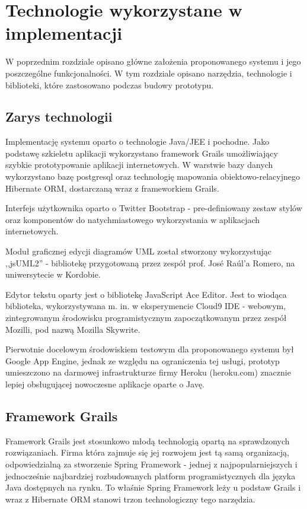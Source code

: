 \chapter{Technologie wykorzystane w implementacji}
  
  W poprzednim rozdziale opisano główne założenia proponowanego systemu i jego poszczególne funkcjonalności. W tym rozdziale opisano narzędzia, technologie i biblioteki, które zastosowano podczas budowy prototypu.

  \section{Zarys technologii}
    
    Implementację systemu oparto o technologie Java/JEE i pochodne. Jako podstawę szkieletu aplikacji wykorzystano framework Grails umożliwiający szybkie prototypowanie aplikacji internetowych. W warstwie bazy danych wykorzystano bazę postgresql oraz technologię mapowania obiektowo-relacyjnego Hibernate ORM, dostarczaną wraz z frameworkiem Grails. 
    
    Interfejs użytkownika oparto o Twitter Bootstrap - pre-definiowany zestaw stylów oraz komponentów do natychmiastowego wykorzystania w aplikacjach internetowych. 

    Moduł graficznej edycji diagramów UML został stworzony wykorzystując ,,jsUML2'' - bibliotekę przygotowaną przez zespół prof. José Raúl'a Romero, na uniwersytecie w Kordobie. 

    Edytor tekstu oparty jest o bibliotekę JavaScript Ace Editor. Jest to wiodąca biblioteka, wykorzystywana m. in. w eksperymencie Cloud9 IDE - webowym, zintegrowanym środowisku programistycznym zapoczątkowanym przez zespół Mozilli, pod nazwą Mozilla Skywrite.
  
    Pierwotnie docelowym środowiskiem testowym dla proponowanego systemu był Google App Engine, jednak ze względu na ograniczenia tej usługi, prototyp umieszczono na darmowej infrastrukturze firmy Heroku (heroku.com) znacznie lepiej obsługującej nowoczesne aplikacje oparte o Javę.

  \section{Framework Grails}
    
    Framework Grails jest stosunkowo młodą technologią opartą na sprawdzonych rozwiązaniach. Firma która zajmuje się jej rozwojem jest tą samą organizacją, odpowiedzialną za stworzenie Spring Framework - jednej z najpopularniejszych i jednocześnie najbardziej rozbudowanych platform programistycznych dla języka Java dostępnych na rynku. To właśnie Spring Framework leży u podstaw Grails i wraz z Hibernate ORM stanowi trzon technologiczny tego narzędzia.

